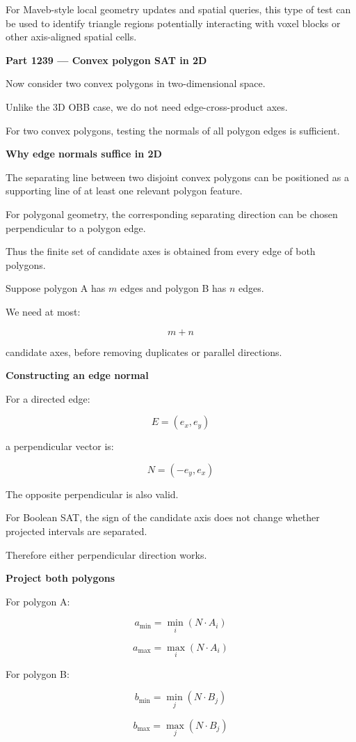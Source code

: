 For Maveb-style local geometry updates and spatial queries, this type of test can be used to identify triangle regions potentially interacting with voxel blocks or other axis-aligned spatial cells.

\textbf{Part 1239 --- Convex polygon SAT in 2D}

Now consider two convex polygons in two-dimensional space.

Unlike the 3D OBB case, we do not need edge-cross-product axes.

For two convex polygons, testing the normals of all polygon edges is sufficient.

\textbf{Why edge normals suffice in 2D}

The separating line between two disjoint convex polygons can be positioned as a supporting line of at least one relevant polygon feature.

For polygonal geometry, the corresponding separating direction can be chosen perpendicular to a polygon edge.

Thus the finite set of candidate axes is obtained from every edge of both polygons.

Suppose polygon A has \(m\) edges and polygon B has \(n\) edges.

We need at most:

\[
\boxed{m+n}
\]

candidate axes, before removing duplicates or parallel directions.

\textbf{Constructing an edge normal}

For a directed edge:

\[
E=(e_x,e_y)
\]

a perpendicular vector is:

\[
\boxed{ N=(-e_y,e_x) }
\]

The opposite perpendicular is also valid.

For Boolean SAT, the sign of the candidate axis does not change whether projected intervals are separated.

Therefore either perpendicular direction works.

\textbf{Project both polygons}

For polygon A:

\[
a_{\min}=\min_i(N\cdot A_i)
\]

\[
a_{\max}=\max_i(N\cdot A_i)
\]

For polygon B:

\[
b_{\min}=\min_j(N\cdot B_j)
\]

\[
b_{\max}=\max_j(N\cdot B_j)
\]


